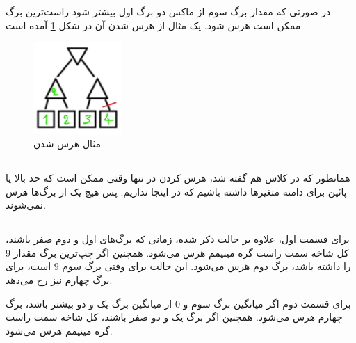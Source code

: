 \documentclass{university}
\begin{document}
در صورتی که مقدار برگ سوم از ماکس دو برگ اول بیشتر شود راست‌ترین برگ ممکن است هرس شود. یک مثال از هرس شدن آن در شکل 
\ref{fig:prone}
آمده است. 

\begin{figure}[!htbp]
    \centering
    \includegraphics[width=0.3\textwidth]{assets/3.png}
    \caption{مثال هرس شدن}
    \label{fig:prone}
\end{figure}

\subsection{}
همانطور که در کلاس هم گفته شد، هرس کردن در 
تنها وقتی ممکن است که حد بالا یا پائین برای دامنه متغیرها داشته باشیم که در اینجا نداریم. 
پس هیچ یک از برگ‌ها هرس نمی‌شوند.

\subsection{}
برای قسمت اول، علاوه بر حالت ذکر شده، زمانی که برگ‌های اول و دوم صفر باشند، کل شاخه سمت راست گره مینیمم هرس می‌شود. 
همچنین اگر چپ‌ترین برگ مقدار 9 را داشته باشد، برگ دوم هرس می‌شود. این حالت برای وقتی برگ سوم 9 است، 
برای برگ چهارم نیز رخ می‌دهد.

برای قسمت دوم اگر میانگین برگ سوم و 0 از میانگین برگ یک و دو بیشتر باشد، برگ چهارم هرس می‌شود. 
همچنین اگر برگ یک و دو صفر باشند، کل شاخه سمت راست گره مینیمم هرس می‌شود.
\end{document}

